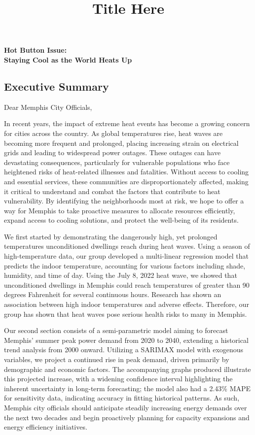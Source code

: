 \documentclass[12pt]{article}
\title{\bfseries Title Here}
\begin{document}
\setcounter{secnumdepth}{4}
\pagestyle{fancy}
\fancyhf{}
\rfoot{}
\begin{center}{\Large{\bfseries{Hot Button Issue:\\ Staying Cool as the World Heats Up}}}\end{center}
\subsection*{Executive Summary}
Dear Memphis City Officials,
\par In recent years, the impact of extreme heat events has become a growing concern for cities across the country. As global temperatures rise, heat waves are becoming more frequent and prolonged, placing increasing strain on electrical grids and leading to widespread power outages. These outages can have devastating consequences, particularly for vulnerable populations who face heightened risks of heat-related illnesses and fatalities. Without access to cooling and essential services, these communities are disproportionately affected, making it critical to understand and combat the factors that contribute to heat vulnerability. By identifying the neighborhoods most at risk, we hope to offer a way for Memphis to take proactive measures to allocate resources efficiently, expand access to cooling solutions, and protect the well-being of its residents.
\par We first started by demonstrating the dangerously high, yet prolonged temperatures unconditioned dwellings reach during heat waves. Using a season of high-temperature data, our group developed a multi-linear regression model that predicts the indoor temperature, accounting for various factors including shade, humidity, and time of day. Using the July 8, 2022 heat wave, we showed that unconditioned dwellings in Memphis could reach temperatures of greater than 90 degrees Fahrenheit for several continuous hours. Research has shown an association between high indoor temperatures and adverse effects.\cite{https://www.ncbi.nlm.nih.gov/books/NBK535285/} Therefore, our group has shown that heat waves pose serious health risks to many in Memphis.
\par Our second section consists of a semi-parametric model aiming to forecast Memphis' summer peak power demand from 2020 to 2040, extending a historical trend analysis from 2000 onward. Utilizing a SARIMAX model with exogenous variables, we project a continued rise in peak demand, driven primarily by demographic and economic factors. The accompanying graphs produced illustrate this projected increase, with a widening confidence interval highlighting the inherent uncertainty in long-term forecasting; the model also had a 2.43\% MAPE for sensitivity data, indicating accuracy in fitting historical patterns. As such, Memphis city officials should anticipate steadily increasing energy demands over the next two decades and begin proactively planning for capacity expansions and energy efficiency initiatives.
\end{document}
